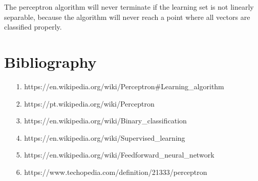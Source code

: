 \documentclass{article}
\begin{document}
    The perceptron algorithm will never terminate if the learning set is not linearly separable, because the algorithm will never reach a point where all vectors are classified properly.
\section{Bibliography}
    \begin{itemize}
        \item[1.] https://en.wikipedia.org/wiki/Perceptron\#Learning\_algorithm
        \item[2.] https://pt.wikipedia.org/wiki/Perceptron
        \item[3.] https://en.wikipedia.org/wiki/Binary\_classification
        \item[4.] https://en.wikipedia.org/wiki/Supervised\_learning
        \item[5.] https://en.wikipedia.org/wiki/Feedforward\_neural\_network
        \item[6.] https://www.techopedia.com/definition/21333/perceptron
    \end{itemize}
\end{document}
